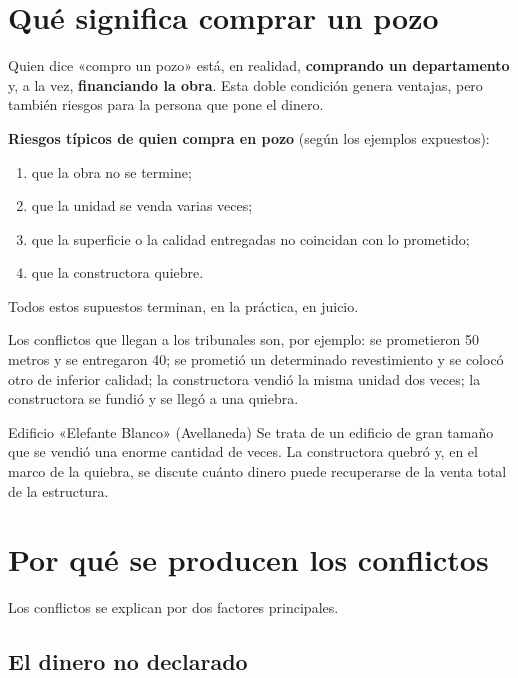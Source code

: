 \documentclass[12pt,oneside]{book}
\begin{document}
\section{Qué significa comprar un pozo}

Quien dice «compro un pozo» está, en realidad, \textbf{comprando un departamento} y, a la vez, \textbf{financiando la obra}. Esta doble condición genera ventajas, pero también riesgos para la persona que pone el dinero.

\begin{important}
\textbf{Riesgos típicos de quien compra en pozo} (según los ejemplos expuestos):
\begin{enumerate}
    \item que la obra no se termine;
    \item que la unidad se venda varias veces;
    \item que la superficie o la calidad entregadas no coincidan con lo prometido;
    \item que la constructora quiebre.
\end{enumerate}
Todos estos supuestos terminan, en la práctica, en juicio.
\end{important}

Los conflictos que llegan a los tribunales son, por ejemplo: se prometieron 50 metros y se entregaron 40; se prometió un determinado revestimiento y se colocó otro de inferior calidad; la constructora vendió la misma unidad dos veces; la constructora se fundió y se llegó a una quiebra.

\begin{example}{Edificio «Elefante Blanco» (Avellaneda)}
Se trata de un edificio de gran tamaño que se vendió una enorme cantidad de veces. La constructora quebró y, en el marco de la quiebra, se discute cuánto dinero puede recuperarse de la venta total de la estructura.
\end{example}

\section{Por qué se producen los conflictos}

Los conflictos se explican por dos factores principales.

\subsection{El dinero no declarado}
\end{document}

